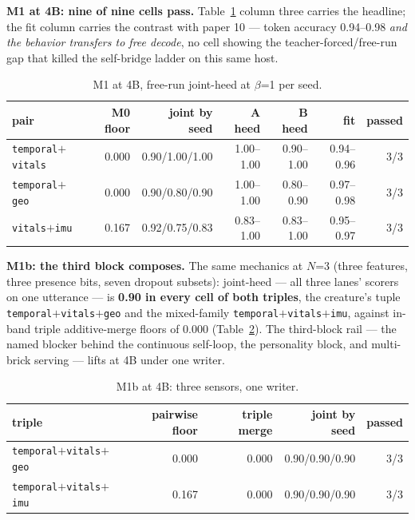 \documentclass[11pt]{article}
\begin{document}
\textbf{M1 at 4B: nine of nine cells pass.}
Table~\ref{tab:m1} column three carries the headline; the fit column
carries the contrast with paper 10 --- token accuracy 0.94--0.98
\emph{and the behavior transfers to free decode}, no cell showing the
teacher-forced/free-run gap that killed the self-bridge ladder on this
same host.

\begin{table}[t]
\centering
\small
\setlength{\tabcolsep}{4pt}
\begin{tabular}{lrrrrrr}
\toprule
pair & M0 floor & joint by seed & A heed & B heed & fit & passed \\
\midrule
\texttt{temporal$+$vitals} & 0.000 & 0.90/1.00/1.00 & 1.00--1.00 & 0.90--1.00 & 0.94--0.96 & 3/3 \\
\texttt{temporal$+$geo} & 0.000 & 0.90/0.80/0.90 & 1.00--1.00 & 0.80--0.90 & 0.97--0.98 & 3/3 \\
\texttt{vitals$+$imu} & 0.167 & 0.92/0.75/0.83 & 0.83--1.00 & 0.83--1.00 & 0.95--0.97 & 3/3 \\
\bottomrule
\end{tabular}
\caption{M1 at 4B, free-run joint-heed at $\beta$=1 per seed.}
\label{tab:m1}
\end{table}

\textbf{M1b: the third block composes.} The same mechanics at $N$=3
(three features, three presence bits, seven dropout subsets): joint-heed
--- all three lanes' scorers on one utterance --- is
\textbf{0.90 in every cell of both triples}, the
creature's tuple \texttt{temporal$+$vitals$+$geo} and the mixed-family
\texttt{temporal$+$vitals$+$imu}, against in-band triple additive-merge
floors of 0.000 (Table~\ref{tab:m1b}). The third-block rail --- the
named blocker behind the continuous self-loop, the personality block, and
multi-brick serving --- lifts at 4B under one writer.

\begin{table}[t]
\centering
\small
\begin{tabular}{lrrrr}
\toprule
triple & pairwise floor & triple merge & joint by seed & passed \\
\midrule
\texttt{temporal$+$vitals$+$geo} & 0.000 & 0.000 & 0.90/0.90/0.90 & 3/3 \\
\texttt{temporal$+$vitals$+$imu} & 0.167 & 0.000 & 0.90/0.90/0.90 & 3/3 \\
\bottomrule
\end{tabular}
\caption{M1b at 4B: three sensors, one writer.}
\label{tab:m1b}
\end{table}
\end{document}
